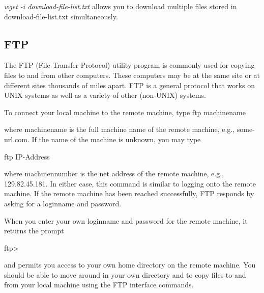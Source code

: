 \documentclass{article}
\begin{document}
\hspace{10mm} \textit{wget -i download-file-list.txt} allows you to download multiple files stored in download-file-list.txt simultaneously.



\newpage

\subsection {FTP}

The FTP (File Transfer Protocol) utility program is commonly used for copying files to and from other computers. These computers may be at the same site or at different sites thousands of miles apart. FTP is a general protocol that works on UNIX systems as well as a variety of other (non-UNIX) systems.

To connect your local machine to the remote machine, type
\hspace{10mm} ftp machinename

where machinename is the full machine name of the remote machine, e.g., some-url.com. If the name of the machine is unknown, you may type

\hspace{10mm}ftp IP-Address

where machinennumber is the net address of the remote machine, e.g., 129.82.45.181. In either case, this command is similar to logging onto the remote machine. If the remote machine has been reached successfully, FTP responds by asking for a loginname and password.

When you enter your own loginname and password for the remote machine, it returns the prompt

\hspace{10mm}ftp>

and permits you access to your own home directory on the remote machine. You should be able to move around in your own directory and to copy files to and from your local machine using the FTP interface commands.
\end{document}
